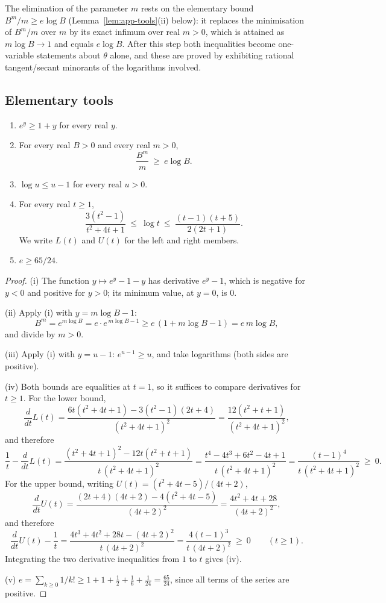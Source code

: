 The elimination of the parameter $m$ rests on the elementary bound
$B^m/m\ge e\log B$ (Lemma~\ref{lem:app-tools}(ii) below): it replaces the
minimisation of $B^m/m$ over $m$ by its exact infimum over real $m>0$, which
is attained as $m\log B\to1$ and equals $e\log B$.  After this step both
inequalities become one-variable statements about $\theta$ alone, and these
are proved by exhibiting rational tangent/secant minorants of the logarithms
involved.

\subsection*{Elementary tools}

\begin{lemma}\label{lem:app-tools}
\begin{enumerate}[label=\textup{(\roman*)}]
\item $e^{y}\ge1+y$ for every real $y$.
\item For every real $B>0$ and every real $m>0$,
\[
        \frac{B^m}{m}\ \ge\ e\log B .
\]
\item $\log u\le u-1$ for every real $u>0$.
\item For every real $t\ge1$,
\[
        \frac{3(t^2-1)}{t^2+4t+1}
        \ \le\ \log t\ \le\
        \frac{(t-1)(t+5)}{2(2t+1)} .
\]
We write $L(t)$ and $U(t)$ for the left and right members.
\item $e\ge 65/24$.
\end{enumerate}
\end{lemma}

\begin{proof}
(i) The function $y\mapsto e^y-1-y$ has derivative $e^y-1$, which is
negative for $y<0$ and positive for $y>0$; its minimum value, at $y=0$, is
$0$.

(ii) Apply (i) with $y=m\log B-1$:
\[
        B^m=e^{m\log B}=e\cdot e^{\,m\log B-1}\ge e\,(1+m\log B-1)=e\,m\log B,
\]
and divide by $m>0$.

(iii) Apply (i) with $y=u-1$: $e^{u-1}\ge u$, and take logarithms (both
sides are positive).

(iv) Both bounds are equalities at $t=1$, so it suffices to compare
derivatives for $t\ge1$.  For the lower bound,
\[
        \frac{d}{dt}L(t)
        =\frac{6t(t^2+4t+1)-3(t^2-1)(2t+4)}{(t^2+4t+1)^2}
        =\frac{12(t^2+t+1)}{(t^2+4t+1)^2},
\]
and therefore
\[
        \frac{1}{t}-\frac{d}{dt}L(t)
        =\frac{(t^2+4t+1)^2-12t(t^2+t+1)}{t\,(t^2+4t+1)^2}
        =\frac{t^4-4t^3+6t^2-4t+1}{t\,(t^2+4t+1)^2}
        =\frac{(t-1)^4}{t\,(t^2+4t+1)^2}\ \ge\ 0 .
\]
For the upper bound, writing $U(t)=(t^2+4t-5)/(4t+2)$,
\[
        \frac{d}{dt}U(t)
        =\frac{(2t+4)(4t+2)-4(t^2+4t-5)}{(4t+2)^2}
        =\frac{4t^2+4t+28}{(4t+2)^2},
\]
and therefore
\[
        \frac{d}{dt}U(t)-\frac1t
        =\frac{4t^3+4t^2+28t-(4t+2)^2}{t\,(4t+2)^2}
        =\frac{4(t-1)^3}{t\,(4t+2)^2}\ \ge\ 0
        \qquad(t\ge1).
\]
Integrating the two derivative inequalities from $1$ to $t$ gives (iv).

(v) $e=\sum_{k\ge0}1/k!\ge1+1+\frac12+\frac16+\frac1{24}=\frac{65}{24}$,
since all terms of the series are positive.
\end{proof}


